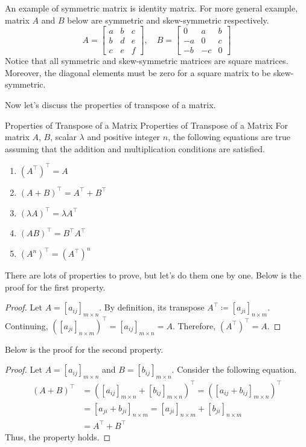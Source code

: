 \documentclass[../main.tex]{subfiles}
\begin{document}
An example of symmetric matrix is identity matrix. For more general
example, matrix $A$ and $B$ below are symmetric and skew-symmetric
respectively.
\[
A =
\begin{bmatrix}
    a & b & c \\
    b & d & e \\
    c & e & f
\end{bmatrix},
\quad
B =
\begin{bmatrix}
    0  & a  & b \\
    -a & 0  & c \\
    -b & -c & 0
\end{bmatrix}
\]
Notice that all symmetric and skew-symmetric matrices are square
matrices. Moreover, the diagonal elements must be zero for a
square matrix to be skew-symmetric.

Now let's discuss the properties of transpose of a matrix.

\begin{theorem}{Properties of Transpose of a Matrix}
{Properties of Transpose of a Matrix}
For matrix $A$, $B$, scalar $\lambda$ and positive integer $n$,
the following equations are true assuming that the addition and
multiplication conditions are satisfied.
\begin{enumerate}
\item $(A^\intercal)^\intercal = A$
\item $(A + B)^\intercal = A^\intercal + B^\intercal$
\item $(\lambda A)^\intercal = \lambda A^\intercal$
\item $(AB)^\intercal = B^\intercal A^\intercal$
\item $(A^n)^\intercal = (A^\intercal)^n$
\end{enumerate}
\end{theorem}

There are lots of properties to prove, but let's do them one by one.
Below is the proof for the first property.

\begin{proof}
Let $A = [a_{ij}]_{m \times n}$. By definition, its transpose
$A^\intercal \coloneqq [a_{ji}]_{n \times m}$. Continuing,
$\left( [a_{ji}]_{n \times m} \right)^\intercal =
[a_{ij}]_{m \times n} = A$. Therefore, $(A^\intercal)^\intercal = A$.
\end{proof}

Below is the proof for the second property.

\begin{proof}
Let $A = [a_{ij}]_{m \times n}$ and $B = [b_{ij}]_{m \times n}$.
Consider the following equation.
\begin{align*}
(A + B)^\intercal
&= \left(
    [a_{ij}]_{m \times n} + [b_{ij}]_{m \times n}
\right)^\intercal
= \left(
    [a_{ij} + b_{ij}]_{m \times n}
\right)^\intercal \\
&= [a_{ji} + b_{ji}]_{n \times m}
= [a_{ji}]_{n \times m} + [b_{ji}]_{n \times m} \\
&= A^\intercal + B^\intercal
\end{align*}
Thus, the property holds.
\end{proof}
\end{document}
